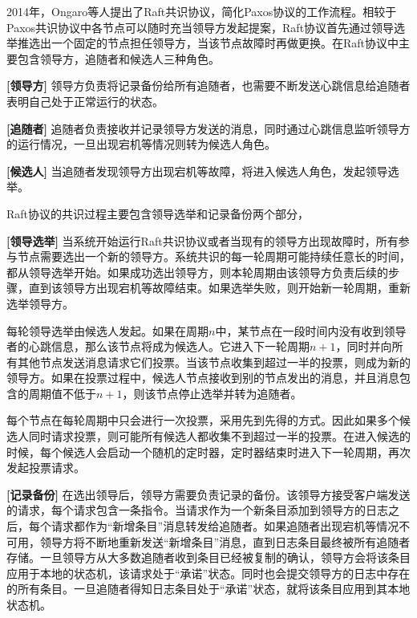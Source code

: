 2014年，Ongaro等人提出了Raft共识协议，简化Paxos协议的工作流程。相较于Paxos共识协议中各节点可以随时充当领导方发起提案，Raft协议首先通过领导选举推选出一个固定的节点担任领导方，当该节点故障时再做更换。在Raft协议中主要包含领导方，追随者和候选人三种角色。

\begin{description}
  \item \textbf{[领导方]} 领导方负责将记录备份给所有追随者，也需要不断发送心跳信息给追随者表明自己处于正常运行的状态。
  \item \textbf{[追随者]} 追随者负责接收并记录领导方发送的消息，同时通过心跳信息监听领导方的运行情况，一旦出现宕机等情况则转为候选人角色。
  \item \textbf{[候选人]} 当追随者发现领导方出现宕机等故障，将进入候选人角色，发起领导选举。
\end{description}

Raft协议的共识过程主要包含领导选举和记录备份两个部分，

\begin{description}
  \item \textbf{[领导选举]} 当系统开始运行Raft共识协议或者当现有的领导方出现故障时，所有参与节点需要选出一个新的领导方。系统共识的每一轮周期可能持续任意长的时间，都从领导选举开始。如果成功选出领导方，则本轮周期由该领导方负责后续的步骤，直到该领导方出现宕机等故障结束。如果选举失败，则开始新一轮周期，重新选举领导方。

  每轮领导选举由候选人发起。如果在周期$n$中，某节点在一段时间内没有收到领导者的心跳信息，那么该节点将成为候选人。它进入下一轮周期$n+1$，同时并向所有其他节点发送消息请求它们投票。当该节点收集到超过一半的投票，则成为新的领导方。如果在投票过程中，候选人节点接收到别的节点发出的消息，并且消息包含的周期值不低于$n+1$，则该节点停止选举并转为追随者。

  每个节点在每轮周期中只会进行一次投票，采用先到先得的方式。因此如果多个候选人同时请求投票，则可能所有候选人都收集不到超过一半的投票。在进入候选的时候，每个候选人会启动一个随机的定时器，定时器结束时进入下一轮周期，再次发起投票请求。

  \item \textbf{[记录备份]} 在选出领导后，领导方需要负责记录的备份。该领导方接受客户端发送的请求，每个请求包含一条指令。当请求作为一个新条目添加到领导方的日志之后，每个请求都作为“新增条目”消息转发给追随者。如果追随者出现宕机等情况不可用，领导方将不断地重新发送“新增条目”消息，直到日志条目最终被所有追随者存储。一旦领导方从大多数追随者收到条目已经被复制的确认，领导方会将该条目应用于本地的状态机，该请求处于“承诺”状态。同时也会提交领导方的日志中存在的所有条目。一旦追随者得知日志条目处于“承诺”状态，就将该条目应用到其本地状态机。
\end{description}

